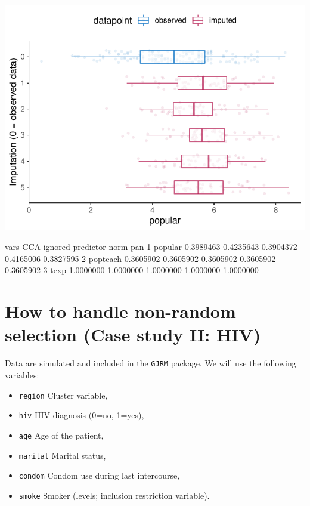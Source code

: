 \documentclass[
]{jss}
\providecommand{\tightlist}{%
  \setlength{\itemsep}{0pt}\setlength{\parskip}{0pt}}
\begin{document}
\begin{CodeChunk}


\begin{center}\includegraphics{Manuscript_files/figure-latex/pop_pan_eval-1} \end{center}

\begin{CodeOutput}
      vars       CCA   ignored predictor      norm       pan
1  popular 0.3989463 0.4235643 0.3904372 0.4165006 0.3827595
2 popteach 0.3605902 0.3605902 0.3605902 0.3605902 0.3605902
3     texp 1.0000000 1.0000000 1.0000000 1.0000000 1.0000000
\end{CodeOutput}
\end{CodeChunk}

\hypertarget{how-to-handle-non-random-selection-case-study-ii-hiv}{%
\section{How to handle non-random selection (Case study II:
HIV)}\label{how-to-handle-non-random-selection-case-study-ii-hiv}}

Data are simulated and included in the \texttt{GJRM} package. We will
use the following variables:

\begin{itemize}
\tightlist
\item
  \texttt{region} Cluster variable,
\item
  \texttt{hiv} HIV diagnosis (0=no, 1=yes),
\item
  \texttt{age} Age of the patient,
\item
  \texttt{marital} Marital status,
\item
  \texttt{condom} Condom use during last intercourse,
\item
  \texttt{smoke} Smoker (levels; inclusion restriction variable).
\end{itemize}
\end{document}

